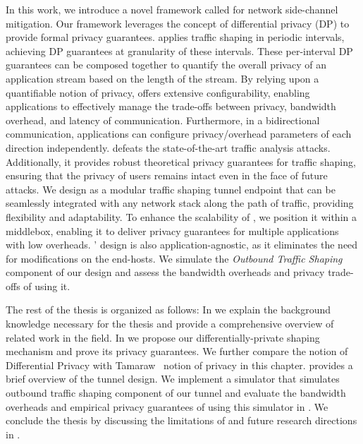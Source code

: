 In this work, we introduce a novel framework called {\sys} for network side-channel mitigation.
Our framework leverages the concept of differential privacy (DP) to provide formal privacy guarantees.
{\sys} applies traffic shaping in periodic intervals, achieving DP guarantees at granularity of these intervals. 
These per-interval DP guarantees can be composed together to quantify the overall privacy of an application stream based on the length of the stream.
By relying upon a quantifiable notion of privacy, {\sys} offers extensive configurability, enabling applications to effectively manage the trade-offs between privacy, bandwidth overhead, and latency of communication.
Furthermore, in a bidirectional communication, applications can configure privacy/overhead parameters of each direction independently.
{\sys} defeats the state-of-the-art traffic analysis attacks.
Additionally, it provides robust theoretical privacy guarantees for traffic shaping, ensuring that the privacy of users remains intact even in the face of future attacks.
We design {\sys} as a modular traffic shaping tunnel endpoint that can be seamlessly integrated with any network stack along the path of traffic, providing flexibility and adaptability.
To enhance the scalability of {\sys}, we position it within a middlebox, enabling it to deliver privacy guarantees for multiple applications with low overheads. 
{\sys}' design is also application-agnostic, as it eliminates the need for modifications on the end-hosts.
We simulate the \emph{Outbound Traffic Shaping} component of our design and assess the bandwidth overheads and privacy trade-offs of {\sys} using it.

The rest of the thesis is organized as follows: 
In  we explain the background knowledge necessary for the thesis and provide a comprehensive overview of related work in the field.
In  we propose our differentially-private shaping mechanism and prove its privacy guarantees. We further compare the notion of Differential Privacy with Tamaraw~\cite{cai2014systematic} notion of privacy in this chapter.
 provides a brief overview of the tunnel design. 
We implement a simulator that simulates outbound traffic shaping component of our tunnel and evaluate the bandwidth overheads and empirical privacy guarantees of {\sys} using this simulator in .
We conclude the thesis by discussing the limitations of {\sys} and future research directions in . 


